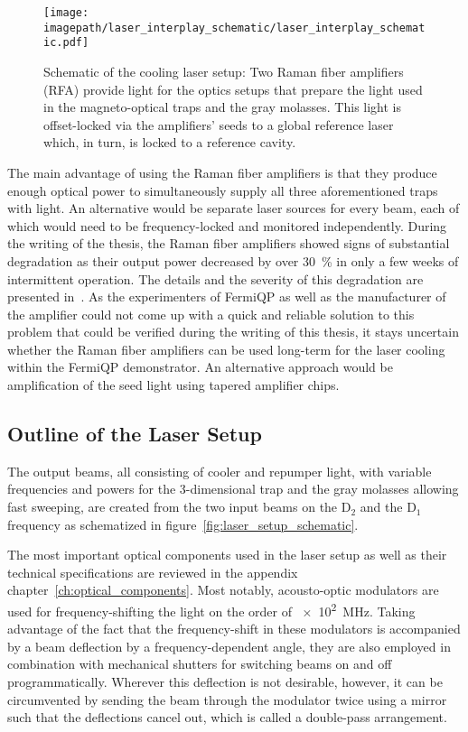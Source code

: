 \begin{figure}
    \centering
    \texttt{[image: \\imagepath/laser\_interplay\_schematic/laser\_interplay\_schematic.pdf]}
    \caption{Schematic of the cooling laser setup: Two Raman fiber amplifiers  (RFA) provide light for the optics setups that prepare the light used in the magneto-optical traps and the gray molasses. This light is offset-locked via the amplifiers' seeds to a global reference laser which, in turn, is locked to a reference cavity.}
    \label{fig:laser_interplay_schematic}
\end{figure}

The main advantage of using the Raman fiber amplifiers is that they produce enough optical power to simultaneously supply all three aforementioned traps with light. An alternative would be separate laser sources for every beam, each of which would need to be frequency-locked and monitored independently. During the writing of the thesis, the Raman fiber amplifiers showed signs of substantial degradation as their output power decreased by over \SI{30}{\percent} in only a few weeks of intermittent operation. The details and the severity of this degradation are presented in~\cite{qesja_design_2022}. As the experimenters of FermiQP as well as the manufacturer of the amplifier could not come up with a quick and reliable solution to this problem that could be verified during the writing of this thesis, it stays uncertain whether the Raman fiber amplifiers can be used long-term for the laser cooling within the FermiQP demonstrator. An alternative approach would be amplification of the seed light using tapered amplifier chips.

\subsection*{Outline of the Laser Setup}
The output beams, all consisting of cooler and repumper light, with variable frequencies and powers for the 3-dimensional trap and the gray molasses allowing fast sweeping, are created from the two input beams on the D$_2$ and the D$_1$ frequency as schematized in figure~\ref{fig:laser_setup_schematic}.

The most important optical components used in the laser setup as well as their technical specifications are reviewed in the appendix chapter~\ref{ch:optical_components}. Most notably, acousto-optic modulators are used for frequency-shifting the light on the order of \SI{e2}{\mega\hertz}. Taking advantage of the fact that the frequency-shift in these modulators is accompanied by a beam deflection by a frequency-dependent angle, they are also employed in combination with mechanical shutters for switching beams on and off programmatically. Wherever this deflection is not desirable, however, it can be circumvented by sending the beam through the modulator twice using a mirror such that the deflections cancel out, which is called a double-pass arrangement.

